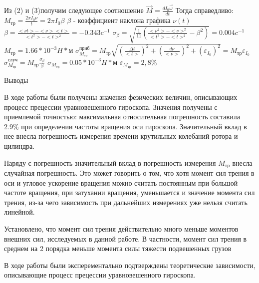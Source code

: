 \documentclass[12pt,a4paper]{article}
\begin{document}
Из (2) и (3)получим следующее соотношение \hfill \break
$\vec{M}=\frac{dI_{0}\vec{\omega}}{dt}$ \hfill \break
Тогда справедливо: \hfill \break
$M_{\text{тр}}=\frac{2\pi{I_{0}}\nu}{t}=2\pi{I_{0}}\beta$ \hfill \break
$\beta$ - коэффициент наклона графика $\nu(t)$ \hfill \break
$\beta=\frac{<\nu{t}>-<\nu><t>}{<t^2>-<t>^2}=-0.343c^{-1}$ \hfill \break
$\sigma_{\beta}=\sqrt{\frac{1}{11}(\frac{<{\nu}^2>-<\nu>^2}{<t^2>-<t>^2}-{\beta}^2)}=0.004c^{-1}$ \hfill \break
$M_{\text{тр}}=1.66*10^{-3}H*\text{м}$ \hfill \break
$\sigma^{\text{приб}}_{M_{\text{тр}}}=M_{\text{тр}}\sqrt{(\frac{\Delta{t}}{<t>})^2+(\frac{d\nu}{<\nu>})^2+(\varepsilon_{I_{0}})^2}=M_{\text{тр}}\varepsilon_{I_{0}}$ \hfill \break
$\sigma^{\text{случ}}_{M_{\text{тр}}}=M_{\text{тр}}\frac{\sigma_{\beta}}{\beta}$ \hfill \break
$\sigma_{M_{\text{тр}}}=0.05*10^{-3}H*\text{м}$ \hfill \break
$\varepsilon_{M_{\text{тр}}}=2,8\%$
\begin{center}
\large Выводы
\end{center}
\par В ходе работы были получены значения фезических величин, описывающих процесс прецессии уравновешенного гироскопа. Значения получены с приемлемой точностью: максимальная относительная погрешность составила $2.9\%$ при определении частоты вращения оси гироскопа. Значительный вклад в нее внесла погрешность измерения времени крутильных колебаний ротора и цилиндра.
\par Наряду с погрешность значительный вклад в погрешность измерения $M_{\text{тр}}$ внесла случайная погрешность. Это может говорить о том, что хотя момент сил трения в оси и угловое ускорение вращения можно считать постоянным при большой частоте вращения, при затухании вращения, уменьшается и значение момента сил трения, из-за чего зависимость при дальнейших измерениях уже нельзя считать линейной.
\par Установлено, что момент сил трения действительно много меньше моментов внешних сил, исследуемых в данной работе. В частности, момент сил трения в среднем на 2 порядка меньше момента силы тяжести подвешенных грузов 
\par В ходе работы были эксперементально подтверждены теоретические зависимости, описывающие процесс прецессии уравновешенного гироскопа.
\end{document}
